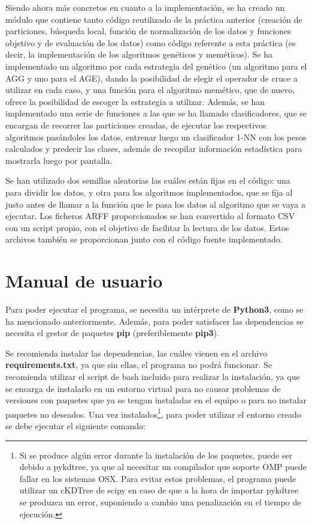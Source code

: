 \documentclass[11pt,a4paper]{article}
\begin{document}
Siendo ahora más concretos en cuanto a la implementación, se ha creado un módulo que contiene tanto código reutilizado de la
práctica anterior (creación de particiones, búsqueda local, función de normalización de los datos y funciones objetivo y de
evaluación de los datos) como código referente a esta práctica (es decir, la implementación de los algoritmos genéticos y
meméticos). Se ha implementado un algoritmo por cada estrategia del genético (un algoritmo para el AGG y uno para el AGE),
dando la posibilidad de elegir el operador de cruce a utilizar en cada caso, y una función para el algoritmo memético, que de
nuevo, ofrece la posibilidad de escoger la estrategia a utilizar. Además, se han implementado una serie de funciones a las
que se ha llamado clasificadores, que se encargan de recorrer las particiones creadas, de ejecutar los respectivos algoritmos
pasándoles los datos, entrenar luego un clasificador 1-NN con los pesos calculados y predecir las clases, además de recopilar
información estadística para mostrarla luego por pantalla. 

Se han utilizado dos semillas aleatorias las cuáles están fijas en el código: una para dividir los datos, y otra para los
algoritmos implementados, que se fija al justo antes de llamar a la función que le pasa los datos al algoritmo que se vaya a
ejecutar. Los ficheros ARFF proporcionados se han convertido al formato CSV con un script propio, con el objetivo de facilitar
la lectura de los datos. Estos archivos también se proporcionan junto con el código fuente implementado.

\newpage

\section{Manual de usuario}

Para poder ejecutar el programa, se necesita un intérprete de \textbf{Python3}, como se ha mencionado anteriormente. Además,
para poder satisfacer las dependencias se necesita el gestor de paquetes \textbf{pip} (preferiblemente \textbf{pip3}).

Se recomienda instalar las dependencias, las cuáles vienen en el archivo \textbf{requirements.txt}, ya que sin ellas, el
programa no podrá funcionar. Se recomienda utilizar el script de bash incluido para realizar la instalación, ya que se
encarga de instalarlo en un entorno virtual para no causar problemas de versiones con paquetes que ya se tengan instaladas en
el equipo o para no instalar paquetes no deseados. Una vez instalados\footnote{Si se produce algún error durante la
instalación de los paquetes, puede ser debido a pykdtree, ya que al necesitar un compilador que soporte OMP puede fallar en
los sistemas OSX. Para evitar estos problemas, el programa puede utilizar un cKDTree de scipy en caso de que a la hora de
importar pykdtree se produzca un error, suponiendo a cambio una penalización en el tiempo de ejecución.}, para poder utilizar
el entorno creado se debe ejecutar el siguiente comando:
\end{document}
